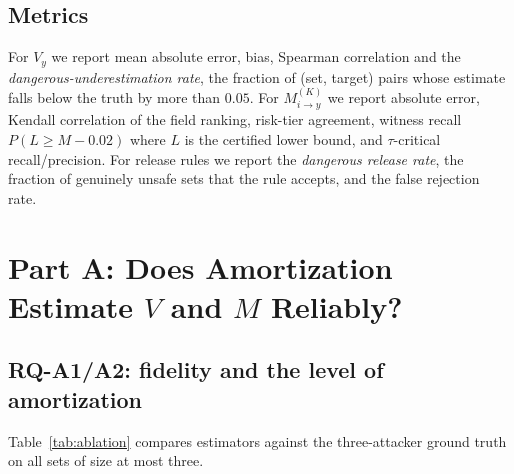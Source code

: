 \documentclass[preprint,12pt]{elsarticle}
\newcommand{\Vy}{V_{y}}
\newcommand{\Mik}{M^{(K)}_{i \to y}}
\begin{document}
\subsection{Metrics}
For $\Vy$ we report mean absolute error, bias, Spearman correlation and the
\emph{dangerous-underestimation rate}, the fraction of (set, target) pairs whose estimate
falls below the truth by more than $0.05$. For $\Mik$ we report absolute error, Kendall
correlation of the field ranking, risk-tier agreement, witness recall
$P(L \ge M - 0.02)$ where $L$ is the certified lower bound, and $\tau$-critical
recall/precision. For release rules we report the \emph{dangerous release rate}, the fraction
of genuinely unsafe sets that the rule accepts, and the false rejection rate.

\section{Part A: Does Amortization Estimate $V$ and $M$ Reliably?}\label{sec:exp-a}

\subsection{RQ-A1/A2: fidelity and the level of amortization}
Table~\ref{tab:ablation} compares estimators against the three-attacker ground truth on all
sets of size at most three.
\end{document}
